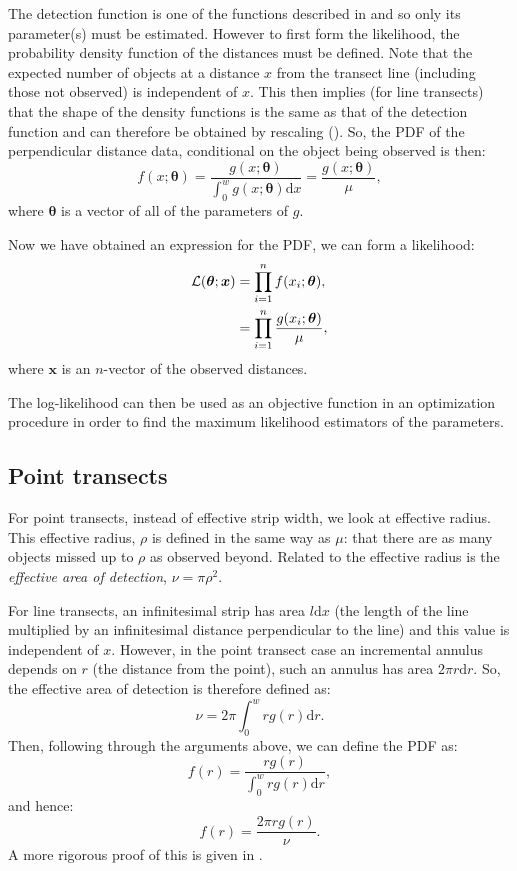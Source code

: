 The detection function is one of the functions described in  and so only its parameter(s) must be estimated. However to first form the likelihood, the probability density function of the distances\label{cor-r59-1} must be defined. Note that the expected number of objects at a distance $x$ from the transect line (including those not observed) is independent of $x$. This then implies (for line transects) that the shape of the density functions is the same as that of the detection function and can therefore be obtained by rescaling (\cite[p. 38]{IDS}). So, the PDF of the perpendicular distance data, conditional on the object being observed is then:
\begin{equation*}
f(x;\bm{\theta}) = \frac{g(x;\bm{\theta})}{\int_0^w g(x;\bm{\theta}) \text{d}x} = \frac{g(x;\bm{\theta})}{\mu},
\end{equation*}
where $\bm{\theta}$ is a vector of all of the parameters of $g$.

Now we have obtained an expression for the PDF, we can form a likelihood:
\begin{align}
\mathcal{L}(\bm{\theta}; \bm{x}) &= \prod_{i=1}^n f(x_i;\bm{\theta}),\notag \\
&= \prod_{i=1}^n \frac{g(x_i;\bm{\theta})}{\mu},
\label{ds-lt-likelihood}
\end{align}\label{cor-7s7}
where $\bm{x}$ is an $n$-vector of the observed distances.

The log-likelihood can then be used as an objective function in an optimization procedure in order to find the maximum likelihood estimators of the parameters.

\subsection{Point transects} 

For point transects, instead\label{cor-7s8} of effective strip width, we look at effective radius. This effective radius, $\rho$ is defined in the same way as $\mu$: that there are as many objects missed up to $\rho$ as observed beyond. Related to the effective radius is the \textit{effective area of detection}, $\nu=\pi \rho^2$.

For line transects, an infinitesimal strip has area $l\text{d}x$ (the length of the line multiplied by an infinitesimal distance perpendicular to the line) and this value is independent of $x$. However, in the point transect case an incremental annulus depends on $r$ (the distance from the point), such an annulus has area $2\pi r \text{d}r$. So, the effective area of detection is therefore defined as:
\begin{equation*}
\nu = 2 \pi \int_0^w r g(r) \text{d}r.
\end{equation*}
Then, following through the arguments above, we can define the PDF as:
\begin{equation*}
f(r) = \frac{r g(r)}{\int_0^w r g(r) \text{d}r},
\end{equation*}
and hence: 
\begin{equation*}
f(r) = \frac{2 \pi r g(r)}{\nu}.
\end{equation*}
A more rigorous proof of this is given in .

